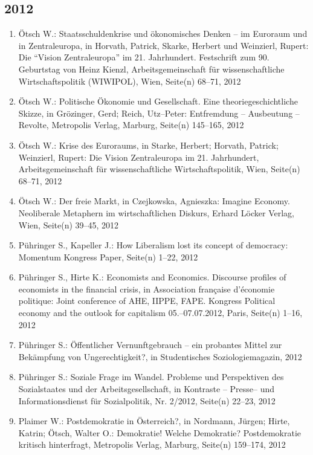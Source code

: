 \subsection*{2012}
\begin{enumerate}
    	 \item Ötsch W.: Staatsschuldenkrise und ökonomisches Denken – im Euroraum und in Zentraleuropa, in Horvath, Patrick, Skarke, Herbert  und Weinzierl, Rupert: Die “Vision Zentraleuropa” im 21. Jahrhundert. Festschrift zum 90. Geburtstag von Heinz Kienzl, Arbeitsgemeinschaft für wissenschaftliche Wirtschaftspolitik (WIWIPOL), Wien, Seite(n) 68--71, 2012
	 \item Ötsch W.: Politische Ökonomie und Gesellschaft. Eine theoriegeschichtliche Skizze, in Grözinger, Gerd; Reich, Utz--Peter: Entfremdung – Ausbeutung – Revolte, Metropolis Verlag, Marburg, Seite(n) 145--165, 2012
	 \item Ötsch W.: Krise des Euroraums, in Starke, Herbert; Horvath, Patrick; Weinzierl, Rupert: Die Vision Zentraleuropa im 21. Jahrhundert, Arbeitsgemeinschaft für wissenschaftliche Wirtschaftspolitik, Wien, Seite(n) 68--71, 2012
	 \item Ötsch W.: Der freie Markt, in Czejkowska, Agnieszka: Imagine Economy. Neoliberale Metaphern im wirtschaftlichen Diskurs, Erhard Löcker Verlag, Wien, Seite(n) 39--45, 2012
	 \item Pühringer S., Kapeller J.: How Liberalism lost its concept of democracy: Momentum Kongress Paper, Seite(n) 1--22, 2012
	 \item Pühringer S., Hirte K.: Economists and Economics. Discourse profiles of economists in the financial crisis, in Association française d'économie politique: Joint conference of AHE, IIPPE, FAPE. Kongress Political economy and the outlook for capitalism 05.--07.07.2012, Paris, Seite(n) 1--16, 2012
	 \item Pühringer S.: Öffentlicher Vernunftgebrauch -- ein probantes Mittel zur Bekämpfung von Ungerechtigkeit?, in Studentisches Soziologiemagazin, 2012
	 \item Pühringer S.: Soziale Frage im Wandel. Probleme und Perspektiven des Sozialstaates und der Arbeitsgesellschaft, in Kontraste -- Presse-- und Informationsdienst für Sozialpolitik, Nr. 2/2012, Seite(n) 22--23, 2012
	 \item Plaimer W.: Postdemokratie in Österreich?, in Nordmann, Jürgen; Hirte, Katrin; Ötsch, Walter O.: Demokratie! Welche Demokratie? Postdemokratie kritisch hinterfragt, Metropolis Verlag, Marburg, Seite(n) 159--174, 2012

\end{enumerate}
